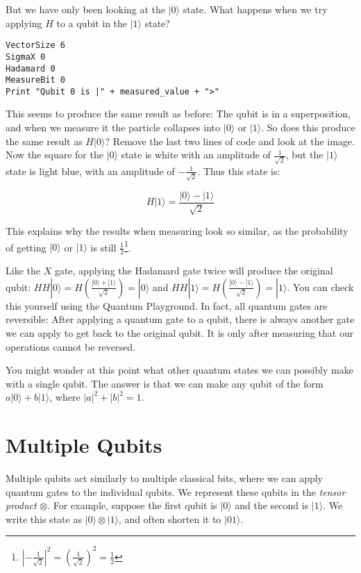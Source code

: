 \documentclass[twocolumn]{article}
\begin{document}
But we have only been looking at the $|0\rangle$ state. What happens when we try applying $H$ to a qubit in the $|1\rangle$ state?

\begin{lstlisting}
VectorSize 6
SigmaX 0
Hadamard 0
MeasureBit 0
Print "Qubit 0 is |" + measured_value + ">"
\end{lstlisting}

This seems to produce the same result as before: The qubit is in a superposition, and when we measure it the particle collapses into $|0\rangle$ or $|1\rangle$. So does this produce the same result as $H|0\rangle$? Remove the last two lines of code and look at the image. Now the square for the $|0\rangle$ state is white with an amplitude of $\frac{1}{\sqrt{2}}$, but the $|1\rangle$ state is light blue, with an amplitude of $-\frac{1}{\sqrt{2}}$. Thus this state is:

$$H|1\rangle = \frac{|0\rangle - |1\rangle}{\sqrt{2}}$$

This explains why the results when measuring look so similar, as the probability of getting $|0\rangle$ or $|1\rangle$ is still $\frac{1}{2}$\footnote{$\left|-\frac{1}{\sqrt{2}}\right|^2 = \left(\frac{1}{\sqrt{2}}\right)^2 = \frac{1}{2}$}.

Like the $X$ gate, applying the Hadamard gate twice will produce the original qubit: $HH|0\rangle = H\left(\frac{|0\rangle + |1\rangle}{\sqrt{2}}\right) = |0\rangle$ and $HH|1\rangle = H\left(\frac{|0\rangle - |1\rangle}{\sqrt{2}}\right) = |1\rangle$. You can check this yourself using the Quantum Playground. In fact, all quantum gates are reversible: After applying a quantum gate to a qubit, there is always another gate we can apply to get back to the original qubit. It is only after measuring that our operations cannot be reversed.

You might wonder at this point what other quantum states we can possibly make with a single qubit. The answer is that we can make any qubit of the form $a|0\rangle + b|1\rangle$, where $|a|^2 + |b|^2 = 1$.

\section{Multiple Qubits}

Multiple qubits act similarly to multiple classical bits, where we can apply quantum gates to the individual qubits. We represent these qubits in the {\em tensor product} $\otimes$. For example, suppose the first qubit is $|0\rangle$ and the second is $|1\rangle$. We write this state as $|0\rangle \otimes |1\rangle$, and often shorten it to $|01\rangle$.
\end{document}
